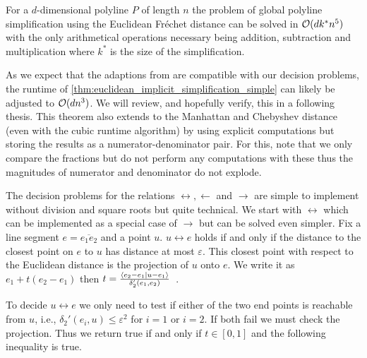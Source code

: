 \begin{theorem}\label{thm:euclidean_implicit_simplification_simple}
  For a \(d\)-dimensional polyline \(P\) of length \(n\) the problem of global polyline simplification using the Euclidean Fréchet distance can be solved in \(\mathcal{O}(d k^*n^5)\) with the only arithmetical operations necessary being addition, subtraction and multiplication where \(k^*\) is the size of the simplification.
\end{theorem}

As we expect that the adaptions from \citeauthor{polyline_simplification_has_cubic_complexity_bringmannetal} are compatible with our decision problems, the runtime of \cref{thm:euclidean_implicit_simplification_simple} can likely be adjusted to \(\mathcal{O}(d n^3)\). We will review, and hopefully verify, this in a following thesis. 
This theorem also extends to the Manhattan and Chebyshev distance (even with the cubic runtime algorithm) by using explicit computations but storing the results as a numerator-denominator pair. For this, note that we only compare the fractions but do not perform any computations with these thus the magnitudes of numerator and denominator do not explode.

The decision problems for the relations \(\leftrightarrow, \leftarrow\) and \(\rightarrow\) are simple to implement without division and square roots but quite technical. We start with \(\leftrightarrow\) which can be implemented as a special case of \(\rightarrow\) but can be solved even simpler. Fix a line segment \(e = \overline{e_1e_2}\) and a point \(u\). \(u \leftrightarrow e\) holds if and only if the distance to the closest point on \(e\) to \(u\) has distance at most \(\varepsilon\). This closest point with respect to the Euclidean distance is the projection of \(u\) onto \(e\). We write it as \(e_1 + t(e_2 - e_1)\) then \(t = \frac{\braket{e_2 - e_1 | u - e_1}}{\delta_2'(e_1, e_2)}\)~\cite{linear_algebra}. 

To decide \(u \leftrightarrow e\) we only need to test if either of the two end points is reachable from \(u\), i.e., \(\delta_2'(e_i, u) \leq \varepsilon^2\) for \(i = 1\) or \(i = 2\). If both fail we must check the projection. Thus we return true if and only if \(t \in [0, 1]\) and the following inequality is true. 

